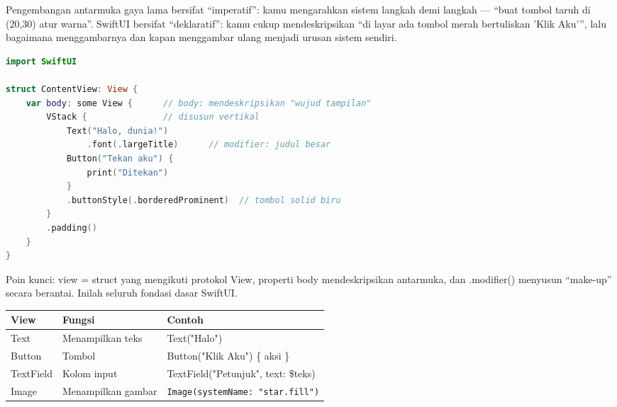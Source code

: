


Pengembangan antarmuka gaya lama bersifat “imperatif”: kamu mengarahkan sistem langkah demi langkah — “buat tombol taruh di (20,30) atur warna”. SwiftUI bersifat “deklaratif”: kamu cukup mendeskripsikan “di layar ada tombol merah bertuliskan 'Klik Aku'”, lalu bagaimana menggambarnya dan kapan menggambar ulang menjadi urusan sistem sendiri.

\begin{lstlisting}[language=Swift]
import SwiftUI

struct ContentView: View {
    var body: some View {      // body: mendeskripsikan "wujud tampilan"
        VStack {               // disusun vertikal
            Text("Halo, dunia!")
                .font(.largeTitle)      // modifier: judul besar
            Button("Tekan aku") {
                print("Ditekan")
            }
            .buttonStyle(.borderedProminent)  // tombol solid biru
        }
        .padding()
    }
}
\end{lstlisting}

Poin kunci: view = struct yang mengikuti protokol View, properti body mendeskripsikan antarmuka, dan .modifier() menyusun “make-up” secara berantai. Inilah seluruh fondasi dasar SwiftUI.


\begin{center}
\begin{tabularx}{\linewidth}{|X|X|X|}
\hline
\textbf{View} & \textbf{Fungsi} & \textbf{Contoh} \tabularnewline
\hline
Text & Menampilkan teks & Text("Halo") \tabularnewline
Button & Tombol & Button("Klik Aku") \{ aksi \} \tabularnewline
TextField & Kolom input & TextField("Petunjuk", text: \$teks) \tabularnewline
Image & Menampilkan gambar & \texttt{Image(systemName: "star.\allowbreak fill")} \tabularnewline
\hline
\end{tabularx}
\end{center}

